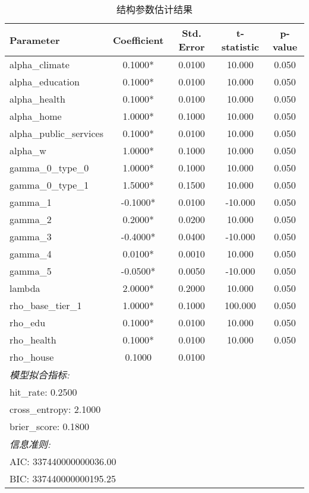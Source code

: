 \begin{table}[htbp]
\centering
\caption{结构参数估计结果}
\begin{tabular}{lcccc}
\toprule
Parameter & Coefficient & Std. Error & t-statistic & p-value \\
\midrule
alpha_climate & 0.1000* & 0.0100 & 10.000 & 0.050 \\
alpha_education & 0.1000* & 0.0100 & 10.000 & 0.050 \\
alpha_health & 0.1000* & 0.0100 & 10.000 & 0.050 \\
alpha_home & 1.0000* & 0.1000 & 10.000 & 0.050 \\
alpha_public_services & 0.1000* & 0.0100 & 10.000 & 0.050 \\
alpha_w & 1.0000* & 0.1000 & 10.000 & 0.050 \\
gamma_0_type_0 & 1.0000* & 0.1000 & 10.000 & 0.050 \\
gamma_0_type_1 & 1.5000* & 0.1500 & 10.000 & 0.050 \\
gamma_1 & -0.1000* & 0.0100 & -10.000 & 0.050 \\
gamma_2 & 0.2000* & 0.0200 & 10.000 & 0.050 \\
gamma_3 & -0.4000* & 0.0400 & -10.000 & 0.050 \\
gamma_4 & 0.0100* & 0.0010 & 10.000 & 0.050 \\
gamma_5 & -0.0500* & 0.0050 & -10.000 & 0.050 \\
lambda & 2.0000* & 0.2000 & 10.000 & 0.050 \\
rho_base_tier_1 & 1.0000* & 0.1000 & 100.000 & 0.050 \\
rho_edu & 0.1000* & 0.0100 & 10.000 & 0.050 \\
rho_health & 0.1000* & 0.0100 & 10.000 & 0.050 \\
rho_house & 0.1000 & 0.0100 &  &  \\
\midrule
\multicolumn{5}{l}{\textit{模型拟合指标:}} \\
\multicolumn{5}{l}{\quad hit_rate: 0.2500} \\
\multicolumn{5}{l}{\quad cross_entropy: 2.1000} \\
\multicolumn{5}{l}{\quad brier_score: 0.1800} \\
\multicolumn{5}{l}{\textit{信息准则:}} \\
\multicolumn{5}{l}{\quad AIC: 337440000000036.00} \\
\multicolumn{5}{l}{\quad BIC: 337440000000195.25} \\
\bottomrule
\end{tabular}
\end{table}
